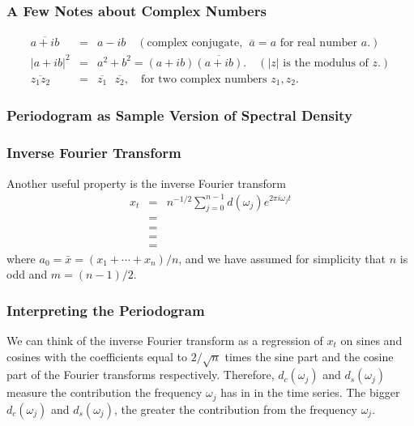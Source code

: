 \documentclass[%
xcolor=pdftex]{beamer}
\begin{document}
\begin{frame}
\frametitle{A Few Notes about Complex Numbers}

\begin{eqnarray*}
\overline{a+ib}&=&a-ib \quad (\mbox{complex conjugate},~~ \overline{a}=a\mbox{~for real number~}a.) \\
|a+ib|^2&=&a^2+b^2=(a+ib)\overline{(a+ib)}. \quad (|z| \mbox{~is the modulus of~} z.) \\
\overline{z_1 z_2} &=& \overline{z_1}\text{  } \overline{z_2}, \quad
\mbox{for two complex numbers~} z_1,z_2.
\end{eqnarray*}

\end{frame}

\begin{frame}
\frametitle{Periodogram as Sample Version of Spectral Density}



\end{frame}

\begin{frame}
\frametitle{Inverse Fourier Transform}

Another useful property is the inverse Fourier transform
\begin{eqnarray*}
x_t&=&n^{-1/2} \sum_{j=0}^{n-1} d(\omega_j) e^{2 \pi i \omega_j t} \\
&=& \\
&=& \\
&=& \\
&=&
\end{eqnarray*}
where $a_0=\bar{x}=(x_1+\cdots+x_n)/n$, and we have assumed for
simplicity that $n$ is odd and $m=(n-1)/2$.

\end{frame}

\begin{frame}
\frametitle{Interpreting the Periodogram}

We can think of the inverse Fourier transform as a
regression of $x_t$ on  sines and cosines with the coefficients
equal to $2/\sqrt{n}$ times the sine part and the cosine part
of the Fourier transforms respectively. Therefore,
$d_c(\omega_j)$ and $d_s(\omega_j)$ measure the contribution the frequency $\omega_j$ has in \underline{\hspace{45 mm}} in
the time series. The bigger $d_c(\omega_j)$ and
$d_s(\omega_j)$, the greater the contribution from the
frequency $\omega_j$.

\end{frame}
\end{document}
